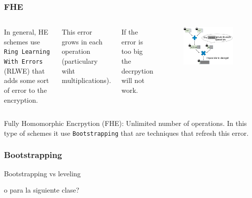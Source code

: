 \documentclass[10pt,handout]{beamer}
\begin{document}


\begin{frame}
    \frametitle{FHE}
  \begin{columns}
    In general, HE schemes use \texttt{Ring Learning With Errors} (RLWE) that  adds some sort of error to the encryption.

\vspace{0.3cm}
    This error grows in each operation (particulary wiht multiplications).

\vspace{0.3cm}
    If the error is too big the decrpytion will not work.
        \begin{figure}[h!]
            \centering
            \includegraphics[scale=0.2]{multNoise.jpg}
        \end{figure}

\end{columns}    Fully Homomorphic Encrpytion (FHE): Unlimited number of operations. In this type of schemes
    it use \texttt{Bootstrapping} that are techniques that refresh this error.


\end{frame}


\begin{frame}
\frametitle{Bootstrapping}

Bootstrapping vs leveling

o para la siguiente clase?
\end{frame}
\end{document}
